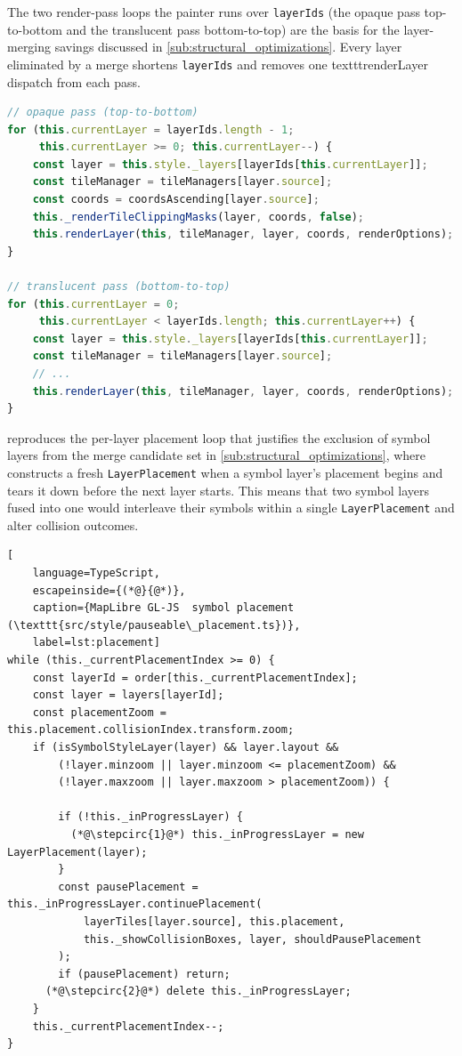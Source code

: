 The two render-pass loops the painter runs over \texttt{layerIds} (the opaque pass top-to-bottom and the translucent pass bottom-to-top) are the basis for the layer-merging savings discussed in \cref{sub:structural_optimizations}.
Every layer eliminated by a merge shortens \texttt{layerIds} and removes one texttt{renderLayer} dispatch from each pass.

\begin{lstlisting}[language=TypeScript,caption={MapLibre GL-JS painter render loop (\texttt{src/render/painter.ts})},label=lst:painter_loop]
// opaque pass (top-to-bottom)
for (this.currentLayer = layerIds.length - 1;
     this.currentLayer >= 0; this.currentLayer--) {
    const layer = this.style._layers[layerIds[this.currentLayer]];
    const tileManager = tileManagers[layer.source];
    const coords = coordsAscending[layer.source];
    this._renderTileClippingMasks(layer, coords, false);
    this.renderLayer(this, tileManager, layer, coords, renderOptions);
}

// translucent pass (bottom-to-top)
for (this.currentLayer = 0;
     this.currentLayer < layerIds.length; this.currentLayer++) {
    const layer = this.style._layers[layerIds[this.currentLayer]];
    const tileManager = tileManagers[layer.source];
    // ...
    this.renderLayer(this, tileManager, layer, coords, renderOptions);
}
\end{lstlisting}

 reproduces the per-layer placement loop that justifies the exclusion of symbol layers from the merge candidate set in \cref{sub:structural_optimizations}, where  constructs a fresh \texttt{LayerPlacement} when a symbol layer's placement begins and  tears it down before the next layer starts.
This means that two symbol layers fused into one would interleave their symbols within a single \texttt{LayerPlacement} and alter collision outcomes.

\begin{lstlisting}[
	language=TypeScript,
	escapeinside={(*@}{@*)},
	caption={MapLibre GL-JS  symbol placement (\texttt{src/style/pauseable\_placement.ts})},
	label=lst:placement]
while (this._currentPlacementIndex >= 0) {
    const layerId = order[this._currentPlacementIndex];
    const layer = layers[layerId];
    const placementZoom = this.placement.collisionIndex.transform.zoom;
    if (isSymbolStyleLayer(layer) && layer.layout &&
        (!layer.minzoom || layer.minzoom <= placementZoom) &&
        (!layer.maxzoom || layer.maxzoom > placementZoom)) {

        if (!this._inProgressLayer) {
          (*@\stepcirc{1}@*) this._inProgressLayer = new LayerPlacement(layer);
        }
        const pausePlacement = this._inProgressLayer.continuePlacement(
            layerTiles[layer.source], this.placement,
            this._showCollisionBoxes, layer, shouldPausePlacement
        );
        if (pausePlacement) return;
      (*@\stepcirc{2}@*) delete this._inProgressLayer;
    }
    this._currentPlacementIndex--;
}
\end{lstlisting}

